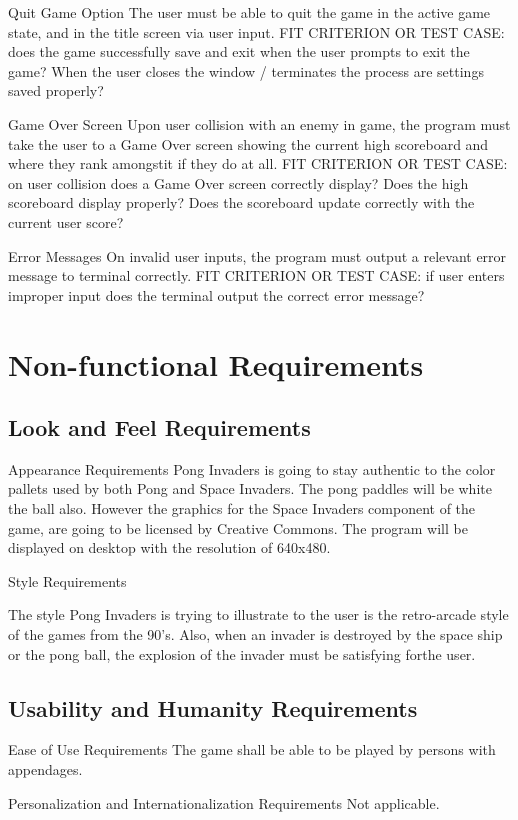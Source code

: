 \documentclass[12pt, titlepage]{article}
\begin{document}
Quit Game Option
The user must be able to quit the game in the active game state, and in the
title screen via user input.
FIT CRITERION OR TEST CASE: does the game successfully save and exit when the
user prompts to exit the game? When the user closes the window / terminates the
process are settings saved properly?


Game Over Screen
Upon user collision with an enemy in game, the program must take the user to a
Game Over screen showing the current high scoreboard and where they rank
amongstit if they do at all.
FIT CRITERION OR TEST CASE: on user collision does a Game Over screen correctly
display? Does the high scoreboard display properly? Does the scoreboard update
correctly with the current user score?


Error Messages
On invalid user inputs, the program must output a relevant error message to
terminal correctly.
FIT CRITERION OR TEST CASE: if user enters improper input does the terminal
output the correct error message?
\section{Non-functional Requirements}
\subsection{Look and Feel Requirements}
Appearance Requirements
Pong Invaders is going to stay authentic to the color pallets used by both Pong
and Space Invaders. The pong paddles will be white the ball also. However the
graphics for the Space Invaders component of the game, are going to be licensed
by Creative Commons. The program will be displayed on desktop with the
resolution of 640x480.


Style Requirements

The style Pong Invaders is trying to illustrate to the user is the retro-arcade
style of the games from the 90’s. Also, when an invader is destroyed by the
space ship or the pong ball, the explosion of the invader must be satisfying
forthe user.


\subsection{Usability and Humanity Requirements}
Ease of Use Requirements 
The game shall be able to be played by persons with appendages. 

Personalization and Internationalization Requirements
Not applicable. 
\end{document}
